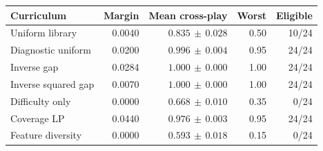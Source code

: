 \begin{tabular}{lrrrr}
\toprule
Curriculum & Margin & Mean cross-play & Worst & Eligible \\
\midrule
Uniform library & 0.0040 & $0.835\,\pm\,0.028$ & 0.50 & 10/24 \\
Diagnostic uniform & 0.0200 & $0.996\,\pm\,0.004$ & 0.95 & 24/24 \\
Inverse gap & 0.0284 & $1.000\,\pm\,0.000$ & 1.00 & 24/24 \\
Inverse squared gap & 0.0070 & $1.000\,\pm\,0.000$ & 1.00 & 24/24 \\
Difficulty only & 0.0000 & $0.668\,\pm\,0.010$ & 0.35 & 0/24 \\
Coverage LP & 0.0440 & $0.976\,\pm\,0.003$ & 0.95 & 24/24 \\
Feature diversity & 0.0000 & $0.593\,\pm\,0.018$ & 0.15 & 0/24 \\
\bottomrule
\end{tabular}
